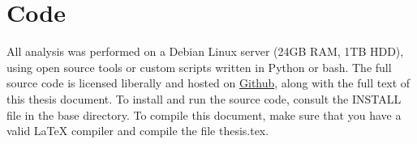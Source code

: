 \chapter{Code}

All analysis was performed on a Debian Linux server (24GB RAM, 1TB HDD), using open source tools or custom scripts written in Python or bash.
The full source code is licensed liberally and hosted on \href{https://github.com/New-College-of-Florida/Jonathan-Niles-Thesis}{Github},
along with the full text of this thesis document.  To install and run the source code, consult the INSTALL file in the base directory.  To
compile this document, make sure that you have a valid \LaTeX{} compiler and compile the file thesis.tex.




